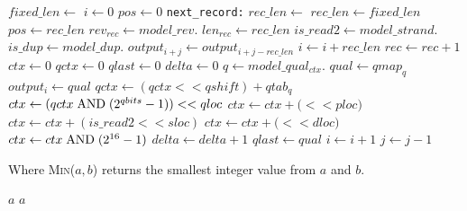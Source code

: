 \documentclass[a4paper]{article}
\begin{document}
\begin{algorithmic}[1]
    \State $fixed\_len \gets $
  \EndIf
  \Statex
  \State $i \gets 0$
  \State $pos \gets 0$
  \Label \texttt{next\_record:}
      \State $rec\_len \gets $
    \Else
      \State $rec\_len \gets fixed\_len$
    \EndIf
    \State $pos \gets rec\_len$
    \Statex
      \State $rev_{rec} \gets model\_rev.$
      \State $len_{rec} \gets rec\_len$
    \EndIf
      \State $is\_read2 \gets model\_strand.$
    \EndIf
    \Statex
      \State $is\_dup \gets model\_dup.$
          \State $output_{i+j} \gets output_{i+j-rec\_len}$
        \EndFor
        \State $i \gets i+rec\_len$
        \State $rec \gets rec+1$
        \State {}
      \EndIf
    \EndIf
    \Statex
    \State $ctx \gets 0$
    \State $qctx \gets 0$
    \State $qlast \gets 0$
    \State $delta \gets 0$
  \EndIf
  \Statex
  \State $q \gets model\_qual_{ctx}.$
  \State $qual \gets qmap_q$
  \State $output_i \gets qual$
  \Statex
  \State $qctx \gets (qctx << qshift) + qtab_q$
  \State $ctx \gets (qctx\bitand (2^{qbits}-1)) << qloc$
    \State $ctx \gets ctx + ($$ << ploc)$
  \EndIf
    \State $ctx \gets ctx + (is\_read2 << sloc)$
  \EndIf
    \State $ctx \gets ctx + ($$ << dloc)$
  \EndIf
  \State $ctx \gets ctx\bitand (2^{16}-1)$
  \Statex
    \State $delta \gets delta + 1$
  \EndIf
  \State $qlast \gets qual$
  \State $i \gets i + 1$
  \State $j \gets j - 1$
\EndWhile
{}
  \State {}
\EndIf
\EndProcedure
\end{algorithmic}

Where \textsc{Min}($a,b$) returns the smallest integer value from $a$ and $b$.

\begin{algorithmic}[1]
    \State \Return $a$
  \Else
    \State \Return $a$
  \EndIf
  \EndFunction
\end{algorithmic}
\end{document}
